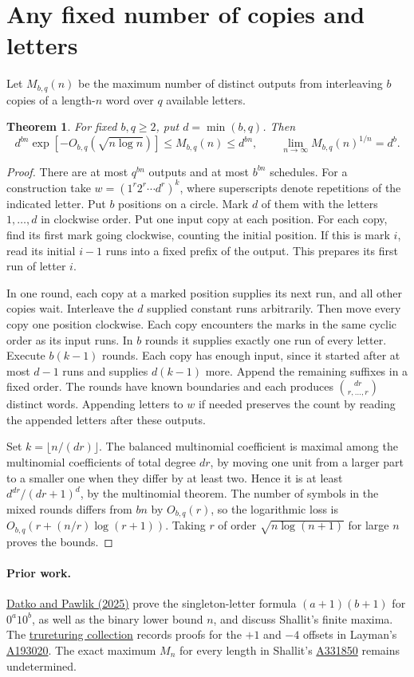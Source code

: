 \documentclass[11pt,letterpaper]{article}
\newtheorem{theorem}{Theorem}
\newcommand{\oeis}[1]{\href{https://oeis.org/A#1}{A#1}}
\begin{document}
\section{Any fixed number of copies and letters}
Let \(M_{b,q}(n)\) be the maximum number of distinct outputs from interleaving \(b\) copies of a length-\(n\) word over \(q\) available letters.
\begin{theorem}
For fixed \(b,q\ge2\), put \(d=\min(b,q)\). Then
\[
 d^{bn}\exp[-O_{b,q}(\sqrt{n\log n})]\le M_{b,q}(n)\le d^{bn},
 \qquad \lim_{n\to\infty}M_{b,q}(n)^{1/n}=d^b.
\]
\end{theorem}
\begin{proof}
There are at most \(q^{bn}\) outputs and at most \(b^{bn}\) schedules. For a construction take \(w=(1^r2^r\cdots d^r)^k\), where superscripts denote repetitions of the indicated letter. Put \(b\) positions on a circle. Mark \(d\) of them with the letters \(1,\ldots,d\) in clockwise order. Put one input copy at each position. For each copy, find its first mark going clockwise, counting the initial position. If this is mark \(i\), read its initial \(i-1\) runs into a fixed prefix of the output. This prepares its first run of letter \(i\).

In one round, each copy at a marked position supplies its next run, and all other copies wait. Interleave the \(d\) supplied constant runs arbitrarily. Then move every copy one position clockwise. Each copy encounters the marks in the same cyclic order as its input runs. In \(b\) rounds it supplies exactly one run of every letter. Execute \(b(k-1)\) rounds. Each copy has enough input, since it started after at most \(d-1\) runs and supplies \(d(k-1)\) more. Append the remaining suffixes in a fixed order. The rounds have known boundaries and each produces \(\binom{dr}{r,\ldots,r}\) distinct words. Appending letters to \(w\) if needed preserves the count by reading the appended letters after these outputs.

Set \(k=\lfloor n/(dr)\rfloor\). The balanced multinomial coefficient is maximal among the multinomial coefficients of total degree \(dr\), by moving one unit from a larger part to a smaller one when they differ by at least two. Hence it is at least \(d^{dr}/(dr+1)^d\), by the multinomial theorem. The number of symbols in the mixed rounds differs from \(bn\) by \(O_{b,q}(r)\), so the logarithmic loss is \(O_{b,q}(r+(n/r)\log(r+1))\). Taking \(r\) of order \(\sqrt{n\log(n+1)}\) for large \(n\) proves the bounds.
\end{proof}

\paragraph{Prior work.}
\href{https://doi.org/10.3390/sym17020305}{Datko and Pawlik (2025)} prove the singleton-letter formula \((a+1)(b+1)\) for \(0^a10^b\), as well as the binary lower bound \(n\), and discuss Shallit's finite maxima. The \href{https://the-omega-institute.github.io/trureturing-mdbook/Library/Digit/layman2011a193020.html}{trureturing collection} records proofs for the \(+1\) and \(-4\) offsets in Layman's \oeis{193020}. The exact maximum \(M_n\) for every length in Shallit's \oeis{331850} remains undetermined.
\end{document}
